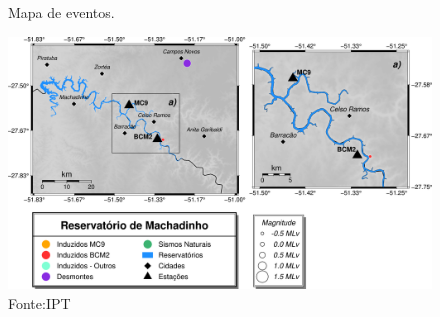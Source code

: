 
\begin{figure}[h]
    \centering
    \caption{Mapa de eventos.}
    \includegraphics[width=1.0\textwidth]{./figuras/mapaevents.png}
    \caption*{Fonte:IPT}
\end{figure}

